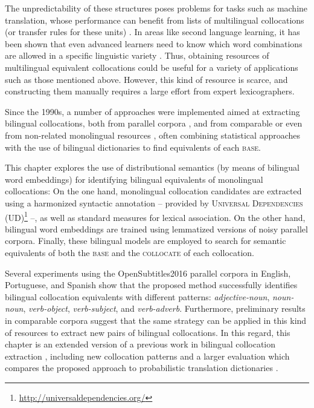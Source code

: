 \documentclass[output=paper
,modfonts
,nonflat]{langsci/langscibook}
\begin{document}
The unpredictability of these structures poses problems for tasks such as
machine translation, whose performance can benefit from lists of multilingual
collocations (or transfer rules for these units) \citep{orliac2003}.
In areas like second language learning, it has been shown that even advanced learners
need to know which word combinations are allowed in a specific linguistic
variety \citep{altenberg2001,ramos2010}. Thus, obtaining resources of multilingual
equivalent collocations could be useful for a variety of applications such as those
mentioned above. However, this kind of resource is scarce, and constructing
them manually requires a large effort from expert lexicographers.

Since the 1990s, a number of approaches were implemented aimed at extracting
bilingual collocations, both from parallel corpora \citep{kupiec1993,smadja1996,wu2003},
and from comparable or even from non-related monolingual resources \citep{lu2004,Rivera2013},
often combining statistical approaches with the use of bilingual dictionaries to
find equivalents of each \textsc{base}.

This chapter explores the use of distributional semantics (by means of bilingual
word embeddings) for identifying bilingual equivalents of monolingual collocations:
On the one hand, monolingual collocation candidates are extracted using a harmonized
syntactic annotation -- provided by \textsc{Universal Dependencies} (UD)\footnote{\scriptsize{\url{http://universaldependencies.org/}}} --,
as well as standard measures for lexical association. On the other hand, bilingual
word embeddings are trained using lemmatized versions of noisy parallel corpora.
Finally, these bilingual models are employed to search for semantic equivalents of both
the \textsc{base} and the \textsc{collocate} of each collocation.

Several experiments using the OpenSubtitles2016 parallel corpora \citep{opus} in English,
Portuguese, and Spanish  show that the proposed method successfully
identifies bilingual collocation equivalents with different patterns: \emph{adjective-noun},
\emph{noun-noun}, \emph{verb-object}, \emph{verb-subject}, and \emph{verb-adverb}.
Furthermore, preliminary results in comparable corpora suggest that the same strategy
can be applied in this kind of resources to extract new pairs of bilingual
collocations. In this regard, this chapter is an extended version of a previous work
in bilingual collocation extraction \citep{mwe17}, including new collocation
patterns and a larger evaluation which compares the proposed approach to probabilistic
translation dictionaries \citep{hiemstra1998,natools}.
\end{document}
